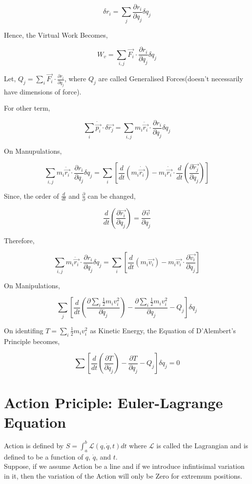 \documentclass[a4paper]{article}
\newcommand{\Lagr}{\mathcal{L}}
\newcommand{\ddt}{\frac{d}{dt}}
\newcommand{\pdt}[2]{\frac{\partial #1}{\partial #2}}
\newcommand{\half}{\frac{1}{2}}
\begin{document}
			$$ \delta r_i = \sum_j \pdt{r_i}{q_j}\delta q_j $$

			Hence, the Virtual Work Becomes,

			$$ W_v = \sum_{i,j} \vec{F_i} \cdot \pdt{r_i}{q_j}\delta q_j $$

			Let, $Q_j = \sum_i \vec{F_i} \cdot \pdt{r_i}{q_j}$, where $Q_j$ are called Generalised Forces(doesn't necessarily have dimensions of force).

			For other term,

			$$ \sum_i \dot{\vec{p_i}} \cdot \delta \vec{r_j}  = \sum_{i,j} m_i \ddot{\vec{r_i}} \cdot \pdt{r_i}{q_j} \delta q_j $$

			On Manupulations,

			$$ \sum_{i,j} m_i \ddot{\vec{r_i}} \cdot \pdt{r_i}{q_j} \delta q_j = \sum_i[ \ddt (m_i \dot{\vec{r_i}}) - m_i \dot{\vec{r_i}} \cdot \ddt(\pdt{\vec{r_j}}{q_j})] $$
			
			Since, the order of $\ddt$ and $\pdt{}{}$ can be changed,

			$$ \ddt(\pdt{\vec{r_i}}{q_j}) = \pdt{\vec{v}}{q_j} $$

			Therefore,

			$$ \sum_{i,j} m_i \ddot{\vec{r_i}} \cdot \pdt{r_i}{q_j} \delta q_j = \sum_i[ \ddt (m_i \vec{v_i}) - m_i \vec{v_i} \cdot \pdt{\vec{v_i}}{q_j}] $$

			On Manipulations, 

			$$ \sum_j [ \ddt(\pdt{\sum_i \half m_i v_i^2}{\dot{q_j}})  - \pdt{\sum_i \half m_i v_i^2}{q_j} - Q_j]\delta q_j $$

			On identifing $T = \sum_i \half m_i v_i^2$ as Kinetic Energy, the Equation of D'Alembert's Principle becomes,

			\begin{equation}
				\sum[\ddt(\pdt{T}{\dot{q_j}}) - \pdt{T}{q_j} - Q_j]\delta q_j = 0 
			\end{equation}

	\section*{Action Priciple: Euler-Lagrange Equation }
		
		\noindent
		
		Action is defined by $S = \int_a^b \Lagr(q, \dot{q}, t) dt$ where $\Lagr$ is called the Lagrangian and is defined to be a function of $q$, $\dot{q}$, and $t$. \hfill \\

		Suppose, if we assume Action be a line and if we introduce infintisimal variation in it, then the variation of the Action will only be Zero for extremum positions.
\end{document}
